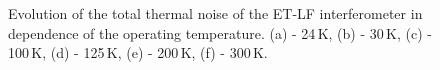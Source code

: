 \begin{figure}[!h]
\begin{center}
\end{center}
\caption{Evolution of the total thermal noise of the ET-LF interferometer in dependence of the operating temperature. (a) - 24\,K, (b) - 30\,K, (c) - 100\,K, (d) - 125\,K, (e) - 200\,K, (f) - 300\,K.}
\label{fig:tn_etlf2}
\end{figure}